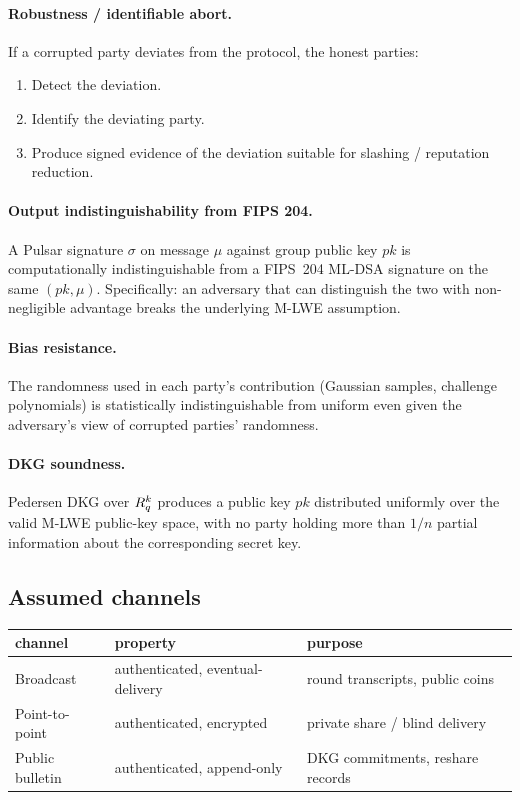 \paragraph{Robustness / identifiable abort.}
If a corrupted party deviates from the protocol, the honest parties:

\begin{enumerate}[leftmargin=*, itemsep=0pt]
\item Detect the deviation.
\item Identify the deviating party.
\item Produce signed evidence of the deviation suitable for slashing
/ reputation reduction.
\end{enumerate}

\paragraph{Output indistinguishability from FIPS 204.}
A Pulsar signature $\sigma$ on message $\mu$ against group public
key $\mathit{pk}$ is computationally indistinguishable from a
FIPS~204 ML-DSA signature on the same $(\mathit{pk}, \mu)$.
Specifically: an adversary that can distinguish the two with
non-negligible advantage breaks the underlying M-LWE assumption.

\paragraph{Bias resistance.}
The randomness used in each party's contribution (Gaussian samples,
challenge polynomials) is statistically indistinguishable from
uniform even given the adversary's view of corrupted parties'
randomness.

\paragraph{DKG soundness.}
Pedersen DKG over $R_q^k$ produces a public key $\mathit{pk}$
distributed uniformly over the valid M-LWE public-key space, with no
party holding more than $1/n$ partial information about the
corresponding secret key.

\subsection{Assumed channels}

\begin{center}
\begin{tabular}{lll}
\toprule
channel & property & purpose \\
\midrule
Broadcast & authenticated, eventual-delivery & round transcripts,
  public coins \\
Point-to-point & authenticated, encrypted & private share / blind
  delivery \\
Public bulletin & authenticated, append-only & DKG commitments,
  reshare records \\
\bottomrule
\end{tabular}
\end{center}

